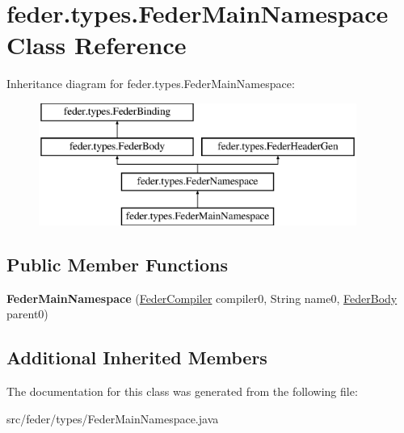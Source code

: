 \hypertarget{classfeder_1_1types_1_1FederMainNamespace}{}\section{feder.\+types.\+Feder\+Main\+Namespace Class Reference}
\label{classfeder_1_1types_1_1FederMainNamespace}
Inheritance diagram for feder.\+types.\+Feder\+Main\+Namespace\+:\begin{figure}[H]
\begin{center}
\leavevmode
\includegraphics[height=4.000000cm]{classfeder_1_1types_1_1FederMainNamespace}
\end{center}
\end{figure}
\subsection*{Public Member Functions}
\begin{DoxyCompactItemize}
\item 
\mbox{\label{classfeder_1_1types_1_1FederMainNamespace_a827a539f2a14818a243a13e99260ed2c}} 
{\bfseries Feder\+Main\+Namespace} (\hyperlink{classfeder_1_1FederCompiler}{Feder\+Compiler} compiler0, String name0, \hyperlink{classfeder_1_1types_1_1FederBody}{Feder\+Body} parent0)
\end{DoxyCompactItemize}
\subsection*{Additional Inherited Members}


The documentation for this class was generated from the following file\+:\begin{DoxyCompactItemize}
\item 
src/feder/types/Feder\+Main\+Namespace.\+java\end{DoxyCompactItemize}
